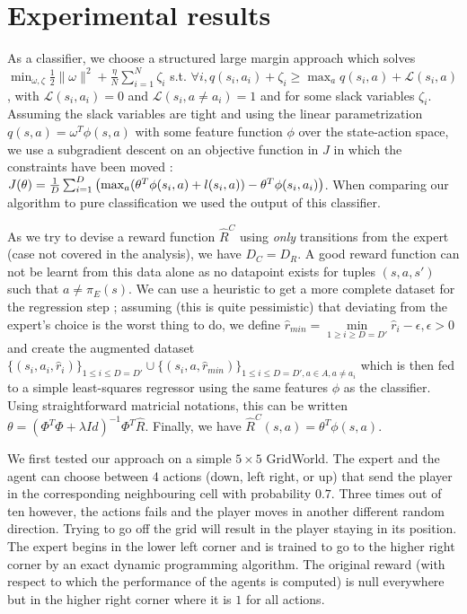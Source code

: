 \documentclass[11pt]{article}
\newcommand{\0}{\mathbf{0}}
\newcommand{\1}{\mathbf{1}}
\begin{document}
\section{Experimental results}
\label{sec-5}

\label{section: experiments}

   As a classifier, we choose a structured large margin approach \cite{taskar2005learning} which solves $\min_{\omega,\zeta}\frac{1}{2}\|\omega\|^2 + \frac{\eta}{N}\sum_{i=1}^N \zeta_i$  s.t. $\forall i, q(s_i,a_i)+\zeta_i \geq \max_a q(s_i,a) + \mathcal L (s_i,a)$, with $\mathcal L(s_i,a_i)=0$ and $\mathcal L(s_i,a\neq a_i)=1$ and for some slack variables $\zeta_i$. Assuming the slack variables are tight and using the linear parametrization $q(s,a) = \omega^T\phi(s,a)$ with some feature function $\phi$ over the state-action space, we use a subgradient descent on an objective function in $J$ in which the constraints have been moved \cite{ratliff2006maximum} : $J(\theta) = {1\over D} \sum_{i=1}^D\left(\max_{a}(\theta^T\phi(s_i,a) + l(s_i,a)) - \theta^T\phi(s_i,a_i) \right)$. When comparing our algorithm to pure classification we used the output of this classifier.

As we try to devise a reward function $\hat R^C$ using \emph{only} transitions from the expert (case not covered in the analysis), we have $D_C = D_R$. A good reward function can not be learnt from this data alone as no datapoint exists for tuples $(s,a,s')$ such that $a \neq \pi_E(s)$. We can use a heuristic to get a more complete dataset for the regression step ; assuming (this is quite pessimistic) that deviating from the expert's choice is the worst thing to do, we define $\hat r_{min} = \min\limits_{1\geq i\geq D=D'} \hat r_i - \epsilon, \epsilon>0$ and create the augmented dataset $\{(s_{i},a_{i},\hat{r}_i)\}_{1\leq i \leq D=D'} \cup \{(s_{i},a,\hat{r}_{min})\}_{1\leq i \leq D=D',a\in A,a\neq a_i}$ which is then fed to a simple least-squares regressor using the same features $\phi$ as the classifier. Using straightforward matricial notations, this can be written $\theta = (\Phi^T\Phi + \lambda Id)^{-1}\Phi^T\hat R$.
Finally, we have $\hat R^C(s,a) = \theta^T \phi(s,a)$.

   We first tested our approach on a simple $5\times 5$ GridWorld. The expert and the agent can choose between 4 actions (down, left right, or up) that send the player in the corresponding neighbouring cell with probability $0.7$. Three times out of ten however, the actions fails and the player moves in another different random direction. Trying to go off the grid will result in the player staying in its position. The expert begins in the lower left corner and is trained to go to the higher right corner by an exact dynamic programming algorithm. The original reward (with respect to which the performance of the agents is computed) is null everywhere but in the higher right corner where it is $1$ for all actions.
\end{document}
